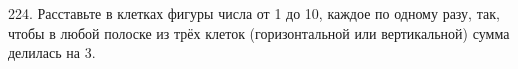 224. Расставьте в клетках фигуры числа от 1 до 10, каждое по одному разу, так, чтобы в любой полоске из трёх клеток (горизонтальной или вертикальной) сумма делилась на 3.
\begin{center}
\begin{figure}[ht!]
\end{figure}
\end{center}
